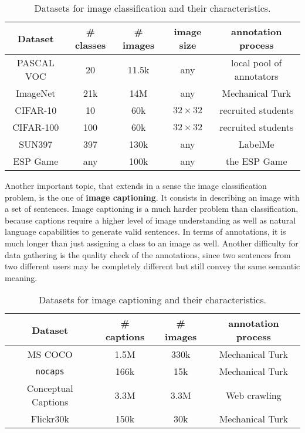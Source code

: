 \vspace{0.5cm}
\begin{table}
	\centering
	\caption{Datasets for image classification and their characteristics.}
	\begin{tabular}{|c|c|c|c|c|}
		\hline
		Dataset & \# classes & \# images & image size & annotation process \\
		\hline
		PASCAL VOC \cite{Everingham10} & 20 & 11.5k & any & local pool of annotators \\
		ImageNet \cite{ILSVRC15} & 21k & 14M & any & Mechanical Turk \\
		CIFAR-10 & 10 & 60k & $32 \times 32$ & recruited students \\
		CIFAR-100 & 100 & 60k & $32 \times 32$ & recruited students \\
		SUN397 \cite{xiao2010sun} & 397 & 130k & any & LabelMe \\
		ESP Game & any & 100k & any & the ESP Game \\
		\hline
	\end{tabular}
	\label{tab:classification_ds}
\end{table}
\vspace{0.5cm}


Another important topic, that extends in a sense the image classification problem, is the one of \textbf{image captioning}. It consists in describing an image with a set of sentences. Image captioning is a much harder problem than classification, because captions require a higher level of image understanding as well as natural language capabilities to generate valid sentences. In terms of annotations, it is much longer than just assigning a class to an image as well. Another difficulty for data gathering is the quality check of the annotations, since two sentences from two different users may be completely different but still convey the same semantic meaning. 

\vspace{0.5cm}

\begin{table}
	\centering
	\caption{Datasets for image captioning and their characteristics.}
	\begin{tabular}{|c|c|c|c|}
		\hline
		Dataset & \# captions & \# images & annotation process \\
		\hline
		MS COCO \cite{chen2015microsoft} & 1.5M & 330k & Mechanical Turk \\
		\texttt{nocaps} \cite{agrawal2019nocaps} & 166k & 15k & Mechanical Turk \\
		Conceptual Captions \cite{sharma-etal-2018-conceptual} & 3.3M & 3.3M & Web crawling \\
		Flickr30k \cite{flickr30k} & 150k & 30k & Mechanical Turk \\
		\hline
	\end{tabular}
	\label{tab:caption_ds}
\end{table}
\vspace{0.5cm}


